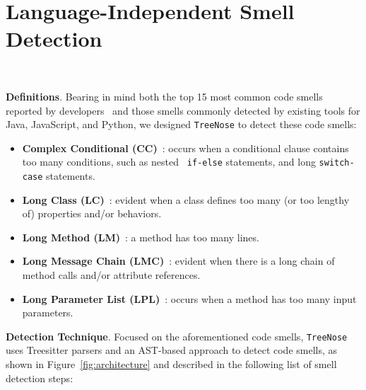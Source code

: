 


\vspace*{-0.5em}

\section{Language-Independent Smell Detection}~\label{sec:approach}

\vspace*{-1em}


{\bf Definitions}. Bearing in mind both the top 15 most common code smells
reported by developers~\cite{developersCare} and those smells commonly detected
by existing tools for Java, JavaScript, and Python, we designed
\texttt{TreeNose} to detect these code smells:

\begin{itemize}[leftmargin=*]
    \item \textbf{Complex Conditional (CC)}~\cite{Fowler_Beck}: occurs when
        a conditional clause contains too many conditions, such as nested {\tt
        if-else} statements, and long {\tt switch-case} statements.
    \item \textbf{Long Class (LC)}~\cite{Fowler_Beck}: evident when a class
        defines too many (or too lengthy of) properties and/or behaviors.
    \item \textbf{Long Method (LM)}~\cite{Fowler_Beck}: a method has too
        many lines.
    \item \textbf{Long Message Chain (LMC)}~\cite{Fowler_Beck}: evident when
        there is a long chain of method calls and/or attribute references.
    \item \textbf{Long Parameter List (LPL)}~\cite{Fowler_Beck}: occurs when
        a method has too many input parameters.
\end{itemize}


{\bf Detection Technique}. Focused on the aforementioned code smells,
\texttt{TreeNose} uses Treesitter parsers and an AST-based approach to detect
code smells, as shown in Figure~\ref{fig:architecture} and described in the
following list of smell detection steps:

